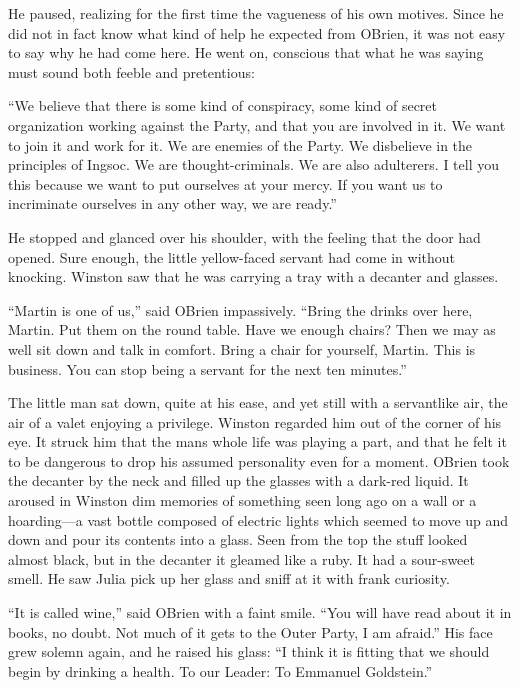 He paused, realizing for the first time the vagueness of his own
motives. Since he did not in fact know what kind of help he expected
from O\textquotesingle Brien, it was not easy to say why he had come
here. He went on, conscious that what he was saying must sound both
feeble and pretentious:

``We believe that there is some kind of conspiracy, some kind of secret
organization working against the Party, and that you are involved in it.
We want to join it and work for it. We are enemies of the Party. We
disbelieve in the principles of Ingsoc. We are thought-criminals. We are
also adulterers. I tell you this because we want to put ourselves at
your mercy. If you want us to incriminate ourselves in any other way, we
are ready.''

He stopped and glanced over his shoulder, with the feeling that the door
had opened. Sure enough, the little yellow-faced servant had come in
without knocking. Winston saw that he was carrying a tray with a
decanter and glasses.

``Martin is one of us,'' said O\textquotesingle Brien impassively. ``Bring
the drinks over here, Martin. Put them on the round table. Have we
enough chairs? Then we may as well sit down and talk in comfort. Bring a
chair for yourself, Martin. This is business. You can stop being a
servant for the next ten minutes.''

The little man sat down, quite at his ease, and yet still with a
servantlike air, the air of a valet enjoying a privilege. Winston
regarded him out of the corner of his eye. It struck him that the
man\textquotesingle s whole life was playing a part, and that he felt it
to be dangerous to drop his assumed personality even for a moment.
O\textquotesingle Brien took the decanter by the neck and filled up the
glasses with a dark-red liquid. It aroused in Winston dim memories of
something seen long ago on a wall or a hoarding---a vast bottle composed
of electric lights which seemed to move up and down and pour its
contents into a glass. Seen from the top the stuff looked almost black,
but in the decanter it gleamed like a ruby. It had a sour-sweet smell.
He saw Julia pick up her glass and sniff at it with frank curiosity.

``It is called wine,'' said O\textquotesingle Brien with a faint smile.
``You will have read about it in books, no doubt. Not much of it gets to
the Outer Party, I am afraid.'' His face grew solemn again, and he raised
his glass: ``I think it is fitting that we should begin by drinking a
health. To our Leader: To Emmanuel Goldstein.''


